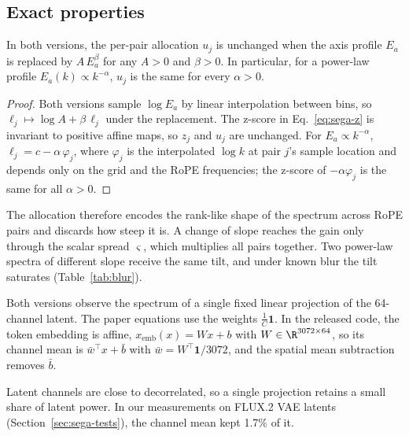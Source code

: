 \subsection{Exact properties}
\label{sec:sega-props}

\begin{proposition}
\label{prop:slope}
In both versions, the per-pair allocation $u_j$ is unchanged when the axis profile $E_a$ is replaced by $A\,E_a^{\beta}$ for any $A>0$ and $\beta>0$. In particular, for a power-law profile $E_a(k)\propto k^{-\alpha}$, $u_j$ is the same for every $\alpha>0$.
\end{proposition}
\begin{proof}
Both versions sample $\log E_a$ by linear interpolation between bins, so $\ell_j \mapsto \log A + \beta\,\ell_j$ under the replacement. The z-score in Eq.~\eqref{eq:sega-z} is invariant to positive affine maps, so $z_j$ and $u_j$ are unchanged. For $E_a\propto k^{-\alpha}$, $\ell_j = c-\alpha\,\varphi_j$, where $\varphi_j$ is the interpolated $\log k$ at pair $j$'s sample location and depends only on the grid and the RoPE frequencies; the z-score of $-\alpha\varphi_j$ is the same for all $\alpha>0$.
\end{proof}
The allocation therefore encodes the rank-like shape of the spectrum across RoPE pairs and discards how steep it is. A change of slope reaches the gain only through the scalar spread $\varsigma$, which multiplies all pairs together. Two power-law spectra of different slope receive the same tilt, and under known blur the tilt saturates (Table~\ref{tab:blur}).

\begin{proposition}
\label{prop:proj}
Both versions observe the spectrum of a single fixed linear projection of the 64-channel latent. The paper equations use the weights $\frac1C\mathbf 1$. In the released code, the token embedding is affine, $x_{\mathrm{emb}}(x)=Wx+b$ with $W\in\R^{3072\times64}$, so its channel mean is $\bar w^\top x + \bar b$ with $\bar w = W^\top\mathbf 1/3072$, and the spatial mean subtraction removes $\bar b$.
\end{proposition}
Latent channels are close to decorrelated, so a single projection retains a small share of latent power. In our measurements on FLUX.2 VAE latents (Section~\ref{sec:sega-tests}), the channel mean kept 1.7\% of it.

